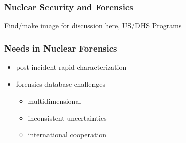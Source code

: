 \begin{frame}
  \frametitle{Nuclear Security and Forensics}
  Find/make image for discussion here, US/DHS Programs
\end{frame}

\begin{frame}
  \frametitle{Needs in Nuclear Forensics}
  \begin{itemize}
    \item post-incident rapid characterization
    \item forensics database challenges
    \begin{itemize}
      \item multidimensional
      \item inconsistent uncertainties
      \item international cooperation
    \end{itemize}
  \end{itemize}
\end{frame}


